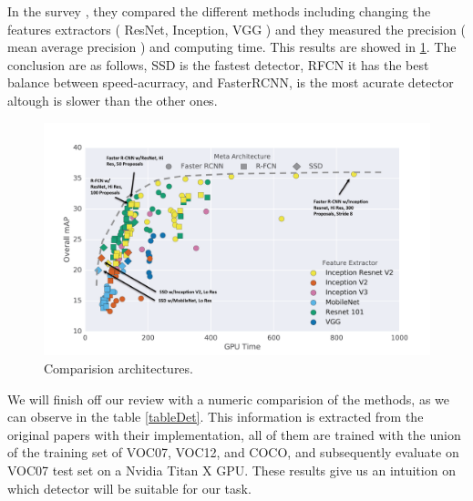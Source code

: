 \documentclass[12pt, a4paper, titlepage,twoside,openright]{article}
\begin{document}
%		
%
%
%
%




In the survey \cite{cnnComparision}, they compared the different methods including changing the features extractors ( ResNet, Inception, VGG ) and they measured the precision ( mean average precision ) and computing time. This results are showed in \ref{comparisio}. The conclusion are as follows, SSD is the fastest detector, RFCN it has the best balance between speed-acurracy, and FasterRCNN, is the most acurate detector altough is slower than the other ones.



\begin{figure}[H]
\centering         
\includegraphics[width=0.9\linewidth]{objectDetection/comparisionTensor.png}
\caption{Comparision architectures.} \label{comparisio}
\end{figure}

We will finish off our review with a numeric comparision of the methods, as we can observe in the table \ref{tableDet}. This information is extracted from the original papers with their implementation, all of them are trained with the union of the training set of VOC07, VOC12, and COCO, and subsequently evaluate on VOC07 test set on a Nvidia Titan X GPU. These results give us an intuition on which detector will be suitable for our task.
\end{document}

